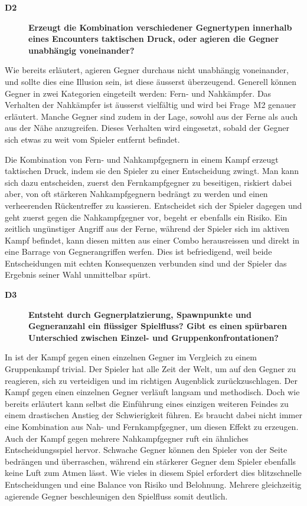 \documentclass[../Main.tex]{subfiles}
\begin{document}
\begin{description}
    \item[\textbf{D2}] \textbf{Erzeugt die Kombination verschiedener Gegnertypen innerhalb eines Encounters taktischen Druck, oder agieren die Gegner unabhängig voneinander?}
\end{description}

Wie bereits erläutert, agieren Gegner durchaus nicht unabhängig voneinander, und sollte dies eine Illusion sein, ist diese äusserst überzeugend. Generell können Gegner in zwei Kategorien eingeteilt werden: Fern- und Nahkämpfer. Das Verhalten der Nahkämpfer ist äusserst vielfältig und wird bei Frage~M2 genauer erläutert. Manche Gegner sind zudem in der Lage, sowohl aus der Ferne als auch aus der Nähe anzugreifen. Dieses Verhalten wird eingesetzt, sobald der Gegner sich etwas zu weit vom Spieler entfernt befindet.

Die Kombination von Fern- und Nahkampfgegnern in einem Kampf erzeugt taktischen Druck, indem sie den Spieler zu einer Entscheidung zwingt. Man kann sich dazu entscheiden, zuerst den Fernkampfgegner zu beseitigen, riskiert dabei aber, von oft stärkeren Nahkampfgegnern bedrängt zu werden und einen verheerenden Rückentreffer zu kassieren. Entscheidet sich der Spieler dagegen und geht zuerst gegen die Nahkampfgegner vor, begeht er ebenfalls ein Risiko. Ein zeitlich ungünstiger Angriff aus der Ferne, während der Spieler sich im aktiven Kampf befindet, kann diesen mitten aus einer Combo herausreissen und direkt in eine Barrage von Gegnerangriffen werfen. Dies ist befriedigend, weil beide Entscheidungen mit echten Konsequenzen verbunden sind und der Spieler das Ergebnis seiner Wahl unmittelbar spürt.

\begin{description}
    \item[\textbf{D3}] \textbf{Entsteht durch Gegnerplatzierung, Spawnpunkte und Gegneranzahl ein flüssiger Spielfluss? Gibt es einen spürbaren Unterschied zwischen Einzel- und Gruppenkonfrontationen?}
\end{description}

In  ist der Kampf gegen einen einzelnen Gegner im Vergleich zu einem Gruppenkampf trivial. Der Spieler hat alle Zeit der Welt, um auf den Gegner zu reagieren, sich zu verteidigen und im richtigen Augenblick zurückzuschlagen. Der Kampf gegen einen einzelnen Gegner verläuft langsam und methodisch. Doch wie bereits erläutert kann selbst die Einführung eines einzigen weiteren Feindes zu einem drastischen Anstieg der Schwierigkeit führen. Es braucht dabei nicht immer eine Kombination aus Nah- und Fernkampfgegner, um diesen Effekt zu erzeugen. Auch der Kampf gegen mehrere Nahkampfgegner ruft ein ähnliches Entscheidungsspiel hervor. Schwache Gegner können den Spieler von der Seite bedrängen und überraschen, während ein stärkerer Gegner dem Spieler ebenfalls keine Luft zum Atmen lässt. Wie vieles in diesem Spiel erfordert dies blitzschnelle Entscheidungen und eine Balance von Risiko und Belohnung. Mehrere gleichzeitig agierende Gegner beschleunigen den Spielfluss somit deutlich.
\end{document}
